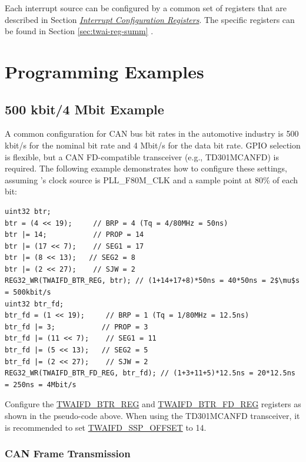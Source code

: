 \documentclass[main\_\_EN.tex]{subfiles}
\begin{document}
Each interrupt source can be configured by a common set of registers that are described in Section \hyperref[interrupt-config-registers]{\textit{Interrupt Configuration Registers}}. The specific registers can be found in Section \ref{sec:twai-reg-summ} \textit{}.



\section{Programming Examples}
\label{sec:twai-prog-procedures}


\subsection{500 kbit/4 Mbit Example}
\label{sec:twai-prog-500-4-example}

A common configuration for CAN bus bit rates in the automotive industry is 500 kbit/s for the nominal bit rate and 4 Mbit/s for the data bit rate. GPIO selection is flexible, but a CAN FD-compatible transceiver (e.g., TD301MCANFD) is required. The following example demonstrates how to configure these settings, assuming \modulename{}'s clock source is PLL\_F80M\_CLK and a sample point at 80\% of each bit:

\begin{lstlisting}[mathescape=true]
uint32 btr;
btr = (4 << 19);     // BRP = 4 (Tq = 4/80MHz = 50ns)
btr |= 14;           // PROP = 14
btr |= (17 << 7);    // SEG1 = 17
btr |= (8 << 13);   // SEG2 = 8
btr |= (2 << 27);    // SJW = 2
REG32_WR(TWAIFD_BTR_REG, btr); // (1+14+17+8)*50ns = 40*50ns = 2$\mu$s = 500kbit/s
uint32 btr_fd;
btr_fd = (1 << 19);     // BRP = 1 (Tq = 1/80MHz = 12.5ns)
btr_fd |= 3;           // PROP = 3
btr_fd |= (11 << 7);    // SEG1 = 11
btr_fd |= (5 << 13);   // SEG2 = 5
btr_fd |= (2 << 27);    // SJW = 2
REG32_WR(TWAIFD_BTR_FD_REG, btr_fd); // (1+3+11+5)*12.5ns = 20*12.5ns = 250ns = 4Mbit/s
\end{lstlisting}

Configure the \hyperref[regdesc:TWAIFDBTRREG]{TWAIFD\_BTR\_REG} and \hyperref[regdesc:TWAIFDBTRFDREG]{TWAIFD\_BTR\_FD\_REG} registers as shown in the pseudo-code above. When using the TD301MCANFD transceiver, it is recommended to set \hyperref[fielddesc:TWAIFDSSPOFFSET]{TWAIFD\_SSP\_OFFSET} to 14.

\subsubsection{CAN Frame Transmission}\label{sec:twai-prog-can-frame-trans}
\end{document}
